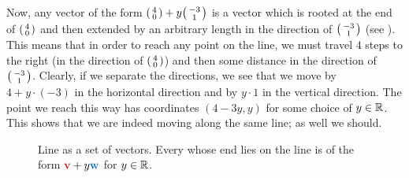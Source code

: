 Now, any vector of the form $\begin{psmallmatrix} 4\\0 \end{psmallmatrix} + y
\begin{psmallmatrix} -3 \\ 1 \end{psmallmatrix}$ is a vector which is rooted at
the end of $\begin{psmallmatrix} 4\\0 \end{psmallmatrix}$ and then extended by
an arbitrary length in the direction of $\begin{psmallmatrix} -3 \\ 1
\end{psmallmatrix}$ (see ). This means
that in order to reach any point on the line, we must travel $4$ steps to the
right (in the direction of $\begin{psmallmatrix} 4\\0 \end{psmallmatrix}$) and
then some distance in the direction of $\begin{psmallmatrix} -3 \\ 1
\end{psmallmatrix}$. Clearly, if we separate the directions, we see that we
move by $4 + y \cdot (-3)$ in the horizontal direction and by $y \cdot 1$ in
the vertical direction. The point we reach this way has coordinates $(4 - 3y,
y)$ for some choice of $y \in \mathbb{R}$. This shows that we are indeed moving along
the same line; as well we should.

\begin{figure}[ht]
 \centering

 \caption{Line as a set of vectors. Every  whose end lies on the
 line is of the form $\clr{\mathbf{v}} + y \clb{\mathbf{w}}$ for $y \in \mathbb{R}$.}
 \label{fig:line-set-of-vectors}
\end{figure}

